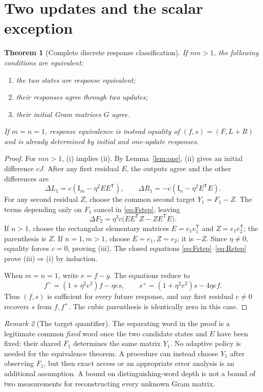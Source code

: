 \documentclass[11pt]{article}
\newtheorem{theorem}{Theorem}[section]
\theoremstyle{remark}\newtheorem{remark}[theorem]{Remark}
\newcommand{\Id}{\mathrm I}
\begin{document}
\section{Two updates and the scalar exception}
\begin{theorem}[Complete discrete response classification]\label{thm:discrete}
If $mn>1$, the following conditions are equivalent:
\begin{enumerate}[label=(\roman*)]
\item the two states are response equivalent;
\item their responses agree through two updates;
\item their initial Gram matrices $G$ agree.
\end{enumerate}
If $m=n=1$, response equivalence is instead equality of
$(f,s)=(F,L+R)$ and is already determined by initial and one-update
responses.
\end{theorem}
\begin{proof}
For $mn>1$, (i) implies (ii). By Lemma~\ref{lem:one}, (ii) gives an
initial difference $cJ$. After any first residual $E$, the outputs agree
and the other differences are
\[
 \Delta L_1=c(\Id_m-\eta^2EE^{\mathsf T}),\qquad
 \Delta R_1=-c(\Id_n-\eta^2E^{\mathsf T}E).
\]
For any second residual $Z$, choose the common second target $Y_1=F_1-Z$.
The terms depending only on $F_1$ cancel in \eqref{eq:Fstep}, leaving
\begin{equation}\label{eq:cubic}
 \Delta F_2=\eta^3c\bigl(EE^{\mathsf T}Z-ZE^{\mathsf T}E\bigr).
\end{equation}
If $n>1$, choose the rectangular elementary matrices
$E=e_1e_1^{\mathsf T}$ and $Z=e_1e_2^{\mathsf T}$; the parenthesis is $Z$.
If $n=1,m>1$, choose $E=e_1,Z=e_2$; it is $-Z$.
Since $\eta\ne0$, equality forces $c=0$, proving (iii).
The closed equations \eqref{eq:Fstep}--\eqref{eq:Rstep} prove
(iii)$\Rightarrow$(i) by induction.

When $m=n=1$, write $e=f-y$. The equations reduce to
\begin{equation}\label{eq:scalar}
 f^+=(1+\eta^2e^2)f-\eta es,\qquad
 s^+=(1+\eta^2e^2)s-4\eta ef.
\end{equation}
Thus $(f,s)$ is sufficient for every future response, and any first
residual $e\ne0$ recovers $s$ from $f,f^+$. The cubic parenthesis is
identically zero in this case.
\end{proof}

\begin{remark}[The target quantifier]
The separating word in the proof is a legitimate common \emph{fixed}
word once the two candidate states and $E$ have been fixed: their shared
$F_1$ determines the same matrix $Y_1$. No adaptive policy is needed for
the equivalence theorem. A procedure can instead choose $Y_1$ after
observing $F_1$, but then exact access or an appropriate error analysis
is an additional assumption. A bound on distinguishing-word depth is
not a bound of two measurements for reconstructing every unknown Gram
matrix.
\end{remark}
\end{document}
